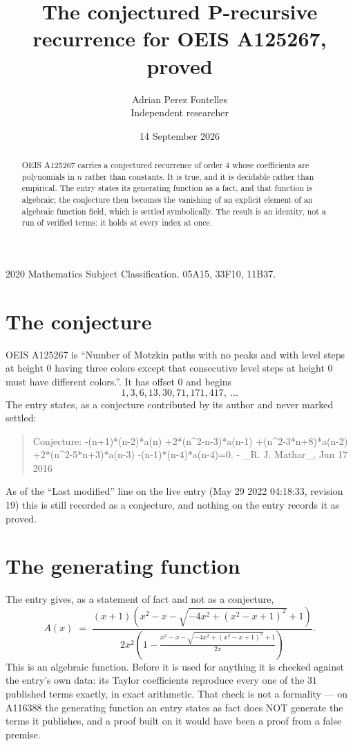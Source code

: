 \documentclass[11pt,a4paper]{article}
\title{The conjectured P-recursive recurrence for OEIS A125267, proved}
\author{Adrian Perez Fontelles\\ \small Independent researcher}
\date{14 September 2026}
\theoremstyle{plain}
\theoremstyle{definition}
\begin{document}
\maketitle

\begin{abstract}
OEIS A125267 carries a conjectured recurrence of order $4$ whose coefficients are polynomials in
$n$ rather than constants. It is true, and it is decidable rather than empirical. The entry
states its generating function as a fact, and that function is algebraic; the conjecture then
becomes the vanishing of an explicit element of an algebraic function field, which is settled
symbolically. The result is an identity, not a run of verified terms: it holds at every index
at once.
\end{abstract}

\noindent\small 2020 Mathematics Subject Classification. 05A15, 33F10, 11B37.\normalsize

\section{The conjecture}

OEIS A125267 is ``Number of Motzkin paths with no peaks and with level steps at height 0 having three colors except that consecutive level steps at height 0 must have different colors.''. It has offset $0$ and begins
\[
1, 3, 6, 13, 30, 71, 171, 417,\ \dots
\]
The entry states, as a conjecture contributed by its author and never marked settled:
\begin{quote}\raggedright\small
Conjecture: -(n+1)*(n-2)*a(n) +2*(n\^{}2-n-3)*a(n-1) +(n\^{}2-3*n+8)*a(n-2) +2*(n\^{}2-5*n+3)*a(n-3) -(n-1)*(n-4)*a(n-4)=0. - \_R. J. Mathar\_, Jun 17 2016
\end{quote}
As of the ``Last modified'' line on the live entry (May 29 2022 04:18:33, revision 19)
this is still recorded as a conjecture, and nothing on the entry records it as proved.

\section{The generating function}

The entry gives, as a statement of fact and not as a conjecture,
\[
A(x)\;=\;\frac{\left(x + 1\right) \left(x^{2} - x - \sqrt{- 4 x^{2} + \left(x^{2} - x + 1\right)^{2}} + 1\right)}{2 x^{2} \left(1 - \frac{x^{2} - x - \sqrt{- 4 x^{2} + \left(x^{2} - x + 1\right)^{2}} + 1}{2 x}\right)} .
\]
This is an algebraic function. Before it is used for anything it is checked against the entry's
own data: its Taylor coefficients reproduce every one of the $31$ published terms
exactly, in exact arithmetic. That check is not a formality --- on A116388 the generating
function an entry states as fact does NOT generate the terms it publishes, and a proof built on
it would have been a proof from a false premise.
\end{document}
